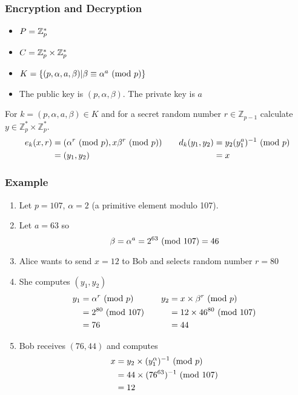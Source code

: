 \subsubsection{Encryption and Decryption}
\begin{itemize}
    \item $P = \mathbb{Z}^*_p$
    \item $C = \mathbb{Z}^*_p \times \mathbb{Z}^*_p$
    \item $K = \{(p,\alpha,a,\beta)| \beta \equiv \alpha^a \ (\mathrm{mod}\ p)\}$
    \item The public key is $(p, \alpha, \beta)$. The private key is $a$
\end{itemize}

For $k = (p,\alpha,a,\beta) \in K$
and for a secret random number $r \in \mathbb{Z}_{p - 1}$
calculate $y \in \mathbb{Z}^*_p \times \mathbb{Z}^*_p$.
\begin{align*}
    e_k(x,r) &= (\alpha^r \ (\mathrm{mod}\ p), x\beta^r \ (\mathrm{mod}\ p)) &\quad d_k(y_1,y_2) &= y_2(y_1^a)^{-1} \ (\mathrm{mod}\ p) \\
             &= (y_1,y_2)                            &                   &= x
\end{align*}

\subsubsection{Example}
\begin{enumerate}
    \item Let $p = 107$, $\alpha = 2$ (a primitive element modulo 107).
    \item Let $a = 63$ so
        $$\beta = \alpha^a = 2^{63} \ (\mathrm{mod}\ 107) = 46$$
    \item Alice wants to send $x = 12$ to Bob and selects random number $r = 80$
    \item She computes $(y_1,y_2)$
            \begin{align*}
                y_1 &= \alpha^r \ (\mathrm{mod}\ p) &\quad y_2 &= x \times \beta^r \ (\mathrm{mod}\ p) \\
                    &= 2^{80} \ (\mathrm{mod}\ 107) &          &= 12 \times 46^{80} \ (\mathrm{mod}\ 107) \\
                    &= 76               &          &= 44
            \end{align*}
    \item Bob receives $(76, 44)$ and computes
        \begin{equation*}
            \begin{split}
                x &= y_2 \times (y_1^\alpha)^{-1} \ (\mathrm{mod}\ p)\\
                  &= 44 \times (76^{63})^{-1} \ (\mathrm{mod}\ 107) \\
                  &= 12
            \end{split}
        \end{equation*}
\end{enumerate}

